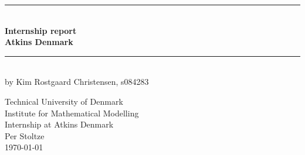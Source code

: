 \begin{titlingpage}
\centering \parindent=0pt
\newcommand{\HRule}{\rule{\textwidth}{1mm}}
 \HRule\\[1cm]\Huge\bfseries
Internship report\\[0.7cm]
\large Atkins Denmark\\[1cm]
\HRule\\[4cm]  
\large by Kim Rostgaard Christensen, s084283\\
 \normalsize %
\begin{flushleft}
Technical University of Denmark\\
Institute for Mathematical Modelling\\
Internship at Atkins Denmark\\
Per Stoltze\\
\today \end{flushleft}
\end{titlingpage}
